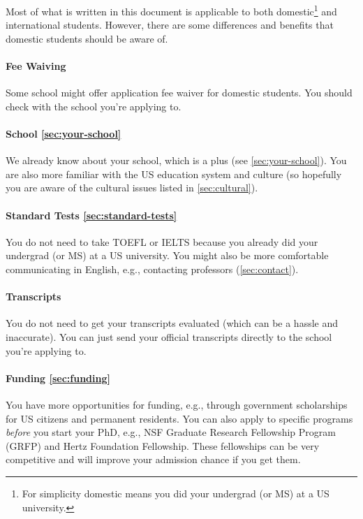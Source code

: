 \documentclass[oneside,11pt,dvipsnames]{book}
\begin{document}
Most of what is written in this document is applicable to both domestic\footnote{For simplicity domestic means you did your undergrad (or MS) at a US university.} and international students.  However, there are some differences and benefits that domestic students should be aware of.

\paragraph{Fee Waiving} Some school might offer application fee waiver for domestic students.  You should check with the school you're applying to.

\paragraph{School \autoref{sec:your-school}} We already know about your school, which is a plus (see \autoref{sec:your-school}). You are also more familiar with the US education system and culture (so hopefully you are aware of the cultural issues listed in \autoref{sec:cultural}).

\paragraph{Standard Tests \autoref{sec:standard-tests}} You do not need to take TOEFL or IELTS because you already did your undergrad (or MS) at a US university.  You might also be more comfortable communicating in English, e.g., contacting professors (\autoref{sec:contact}).

\paragraph{Transcripts} You do not need to get your transcripts evaluated (which can be a hassle and inaccurate).  You can just send your official transcripts directly to the school you're applying to.

\paragraph{Funding \autoref{sec:funding}} You have more opportunities for funding, e.g., through government scholarships for US citizens and permanent residents.  You can also apply to specific programs \emph{before} you start your PhD, e.g., NSF Graduate Research Fellowship Program (GRFP) and Hertz Foundation Fellowship.  These fellowships can be very competitive and will improve your admission chance if you get them.
\end{document}
